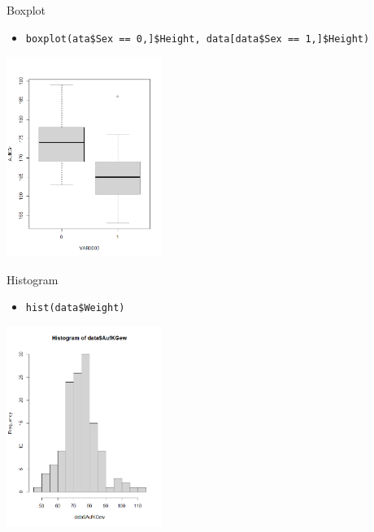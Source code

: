 \documentclass[xcolor=dvipsnames, aspectratio = 169]{beamer}
\begin{document}
\begin{frame}[fragile]{Boxplot}
	\begin{itemize}
		\item \verb+boxplot(ata$Sex == 0,]$Height, data[data$Sex == 1,]$Height)+
	\end{itemize}
			
	\begin{center}
		\includegraphics[height=6.5cm]{Boxplot}
	\end{center}
\end{frame}

\begin{frame}[fragile]{Histogram}
	\begin{itemize}
		\item \verb+hist(data$Weight)+
	\end{itemize}
			
	\begin{center}
		\includegraphics[height=6.5cm]{Histogram}
	\end{center}
\end{frame}
\end{document}
